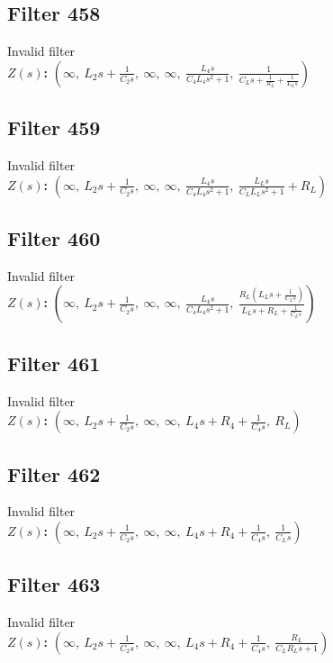 \documentclass{article}
\begin{document}
\subsection*{Filter 458}
Invalid filter \\ 
\textbf{$Z(s)$:} $\left( \infty, \  L_{2} s + \frac{1}{C_{2} s}, \  \infty, \  \infty, \  \frac{L_{4} s}{C_{4} L_{4} s^{2} + 1}, \  \frac{1}{C_{L} s + \frac{1}{R_{L}} + \frac{1}{L_{L} s}}\right)$ \\ 
\subsection*{Filter 459}
Invalid filter \\ 
\textbf{$Z(s)$:} $\left( \infty, \  L_{2} s + \frac{1}{C_{2} s}, \  \infty, \  \infty, \  \frac{L_{4} s}{C_{4} L_{4} s^{2} + 1}, \  \frac{L_{L} s}{C_{L} L_{L} s^{2} + 1} + R_{L}\right)$ \\ 
\subsection*{Filter 460}
Invalid filter \\ 
\textbf{$Z(s)$:} $\left( \infty, \  L_{2} s + \frac{1}{C_{2} s}, \  \infty, \  \infty, \  \frac{L_{4} s}{C_{4} L_{4} s^{2} + 1}, \  \frac{R_{L} \left(L_{L} s + \frac{1}{C_{L} s}\right)}{L_{L} s + R_{L} + \frac{1}{C_{L} s}}\right)$ \\ 
\subsection*{Filter 461}
Invalid filter \\ 
\textbf{$Z(s)$:} $\left( \infty, \  L_{2} s + \frac{1}{C_{2} s}, \  \infty, \  \infty, \  L_{4} s + R_{4} + \frac{1}{C_{4} s}, \  R_{L}\right)$ \\ 
\subsection*{Filter 462}
Invalid filter \\ 
\textbf{$Z(s)$:} $\left( \infty, \  L_{2} s + \frac{1}{C_{2} s}, \  \infty, \  \infty, \  L_{4} s + R_{4} + \frac{1}{C_{4} s}, \  \frac{1}{C_{L} s}\right)$ \\ 
\subsection*{Filter 463}
Invalid filter \\ 
\textbf{$Z(s)$:} $\left( \infty, \  L_{2} s + \frac{1}{C_{2} s}, \  \infty, \  \infty, \  L_{4} s + R_{4} + \frac{1}{C_{4} s}, \  \frac{R_{L}}{C_{L} R_{L} s + 1}\right)$ \\ 
\end{document}
